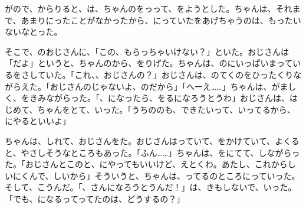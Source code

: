 



\linespread{1.8}
\selectfont
{}がので、からりると、は、ちゃんのをっって、をようとした。ちゃんは、それまで、あまりにったことがなかったから、にっていたをあげちゃうのは、もったいないなとった。

そこで、のおじさんに、「この、もらっちゃいけない？」といた。おじさんは「だよ」というと、ちゃんのから、をりげた。ちゃんは、のにいっぱいまっているをさしていた。「これ、、おじさんの？」おじさんは、のてくのをひったくりながらえた。「おじさんのじゃないよ、のだから」「へーえ……」ちゃんは、がましく、をきみながらった。「、になったら、をるになろうとうわ」おじさんは、はじめて、ちゃんをとて、いった。「うちののも、できたいって、いってるから、にやるといいよ」

ちゃんは、しれて、おじさんをた。おじさんはっていて、をかけていて、よくると、やさしそうなところもあった。「ふん……」ちゃんは、をにてて、しながらった。「おじさんとこのと、にやってもいいけど、えとくわ。あたし、これからしいにくんで、しいから」そういうと、ちゃんは、ってるのところにっていった。そして、こうんだ。「、さんになろうとうんだ！」は、きもしないで、いった。「でも、になるってってたのは、どうするの？」

